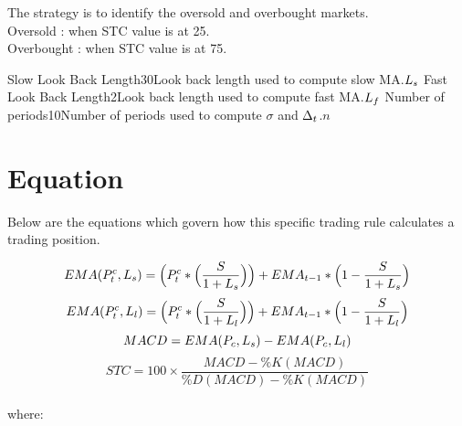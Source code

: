 \documentclass{article}
\begin{document}
\logo
{} %
\tblofcontents


\howtotrade
{The strategy is to identify the oversold and overbought markets.\\
Oversold : when STC value is at 25. \\
Overbought : when STC value is at 75. \\
}

{Slow Look Back Length}{30}{Look back length used to compute slow MA.}{$L_{s}$}
{Fast Look Back Length}{2}{Look back length used to compute fast MA.}{$L_{f}$}
{Number of periods}{10}{Number of periods used to compute $\sigma$ and $\Delta_{t}$.}{$n$}
\stoptable %

\newpage
\section{Equation}
Below are the equations which govern how this specific trading rule calculates a trading position.

\begin{equation}
    EMA(P_{t}^{c}, L_{s}) = \Big(P_{t}^{c} * \Big(\frac{S}{1 + L_{s}}\Big)\Big) + EMA_{t-1} * \Big(1-\frac{S}{1 + L_{s}}\Big)
\end{equation}
\begin{equation}
    EMA(P_{t}^{c}, L_{l}) = \Big(P_{t}^{c} * \Big(\frac{S}{1 + L_{l}}\Big)\Big) + EMA_{t-1} * \Big(1-\frac{S}{1 + L_{l}}\Big)
\end{equation}
\begin{equation}
    MACD = EMA(P_{c}, L_{s}) - EMA(P_{c}, L_{l})
\end{equation}
\begin{equation}
    STC = 100 \times \frac{MACD - \%K(MACD)}{\%D(MACD) - \%K(MACD)}
\end{equation}
\\ %
where:
\end{document}
